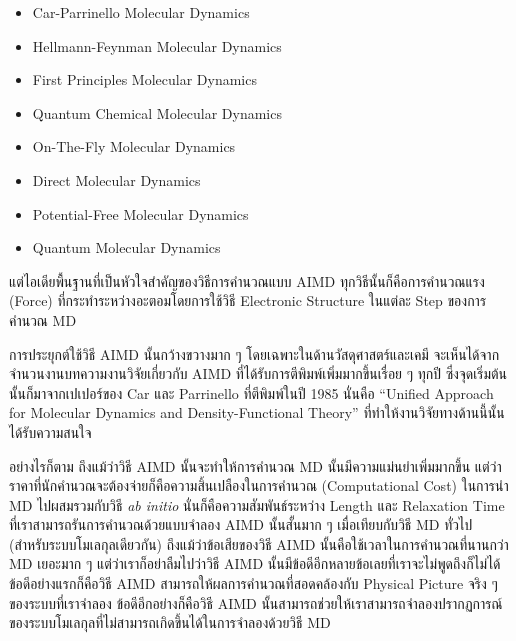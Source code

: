 \begin{itemize}[topsep=0pt,noitemsep]
  \setlength\itemsep{0.5em}
  \item Car-Parrinello Molecular Dynamics

  \item Hellmann-Feynman Molecular Dynamics

  \item First Principles Molecular Dynamics

  \item Quantum Chemical Molecular Dynamics

  \item On-The-Fly Molecular Dynamics

  \item Direct Molecular Dynamics

  \item Potential-Free Molecular Dynamics

  \item Quantum Molecular Dynamics
\end{itemize}

แต่ไอเดียพื้นฐานที่เป็นหัวใจสำคัญของวิธีการคำนวณแบบ AIMD ทุกวิธีนั้นก็คือการคำนวณแรง (Force) ที่กระทำระหว่างอะตอมโดยการใช้วิธี
Electronic Structure ในแต่ละ Step ของการคำนวณ MD

การประยุกต์ใช้วิธี AIMD นั้นกว้างขวางมาก ๆ โดยเฉพาะในด้านวัสดุศาสตร์และเคมี จะเห็นได้จากจำนวนงานบทความงานวิจัยเกี่ยวกับ AIMD
ที่ได้รับการตีพิมพ์เพิ่มมากขึ้นเรื่อย ๆ ทุกปี ซึ่งจุดเริ่มต้นนั้นก็มาจากเปเปอร์ของ Car และ Parrinello ที่ตีพิมพ์ในปี 1985 นั่นคือ
\enquote{Uniﬁed Approach for Molecular Dynamics and Density-Functional Theory} ที่ทำให้งานวิจัยทางด้านนี้นั้นได้รับความสนใจ

อย่างไรก็ตาม ถึงแม้ว่าวิธี AIMD นั้นจะทำให้การคำนวณ MD นั้นมีความแม่นยำเพิ่มมากขึ้น แต่ว่าราคาที่นักคำนวณจะต้องจ่ายก็คือความสิ้นเปลืองในการคำนวณ
(Computational Cost) ในการนำ MD ไปผสมรวมกับวิธี \textit{ab initio} นั่นก็คือความสัมพันธ์ระหว่าง Length และ Relaxation Time
ที่เราสามารถรันการคำนวณด้วยแบบจำลอง AIMD นั้นสั้นมาก ๆ เมื่อเทียบกับวิธี MD ทั่วไป (สำหรับระบบโมเลกุลเดียวกัน) ถึงแม้ว่าข้อเสียของวิธี AIMD
นั้นคือใช้เวลาในการคำนวณที่นานกว่า MD เยอะมาก ๆ แต่ว่าเราก็อย่าลืมไปว่าวิธี AIMD นั้นมีข้อดีอีกหลายข้อเลยที่เราจะไม่พูดถึงก็ไม่ได้
ข้อดีอย่างแรกก็คือวิธี AIMD สามารถให้ผลการคำนวณที่สอดคล้องกับ Physical Picture จริง ๆ ของระบบที่เราจำลอง ข้อดีอีกอย่างก็คือวิธี AIMD
นั้นสามารถช่วยให้เราสามารถจำลองปรากฏการณ์ของระบบโมเลกุลที่ไม่สามารถเกิดขึ้นได้ในการจำลองด้วยวิธี MD

